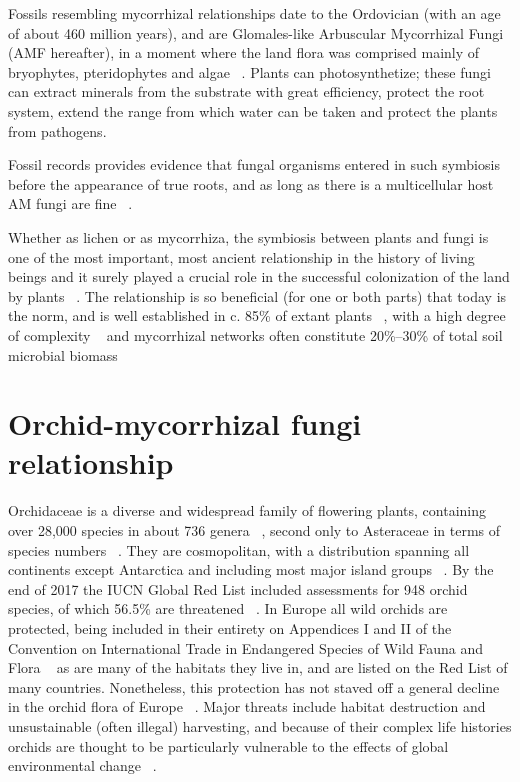 Fossils resembling mycorrhizal relationships date to the Ordovician (with an age of about 460 million years), and are Glomales-like Arbuscular Mycorrhizal Fungi (AMF hereafter), in a moment where the land flora was comprised mainly of bryophytes, pteridophytes and algae ~\citep{redecker2000}. Plants can photosynthetize; these fungi can extract minerals from the substrate with great efficiency, protect the root system, extend the range from which water can be taken and protect the plants from pathogens.

Fossil records provides evidence that fungal organisms entered in such symbiosis before the appearance of true roots, and as long as there is a multicellular host AM fungi are fine ~\citep{wang2006, bonfante2008}.

Whether as lichen or as mycorrhiza, the symbiosis between plants and fungi is one of the most important, most ancient relationship in the history of living beings and it surely played a crucial role in the successful colonization of the land by plants ~\citep{pirozynski1975, malloch1980, harley1987, trappe1987, selosse1998, brundrett2002}. The relationship is so beneficial (for one or both parts) that today is the norm, and is well established in c. 85\% of extant plants ~\citep{cairney2000, strullu-derrien2018}, with a high degree of complexity ~\citep{heijden2015} and mycorrhizal networks often constitute 20\%–30\% of total soil microbial biomass ~\citep{leake2011}

\chapter{Orchid-mycorrhizal fungi relationship}
\label{orchid-mycorrhizalfungirelationship}

Orchidaceae is a diverse and widespread family of flowering plants, containing over 28,000 species in about 736 genera ~\citep{christenhusz2016}, second only to Asteraceae in terms of species numbers ~\citep{ramirez2007}. They are cosmopolitan, with a distribution spanning all continents except Antarctica and including most major island groups ~\citep{givnish2016}.
By the end of 2017 the IUCN Global Red List included assessments for 948 orchid species, of which 56.5\% are threatened ~\citep{fay2018}. In Europe all wild orchids are protected, being included in their entirety on Appendices I and II of the Convention on International Trade in Endangered Species of Wild Fauna and Flora ~\citep{CITES-1} as are many of the habitats they live in, and are listed on the Red List of many countries. Nonetheless, this protection has not staved off a general decline in the orchid flora of Europe ~\citep{jacquemyn2005, kull2006}. Major threats include habitat destruction and unsustainable (often illegal) harvesting, and because of their complex life histories orchids are thought to be particularly vulnerable to the effects of global environmental change ~\citep{kull2016, gale2018}.


